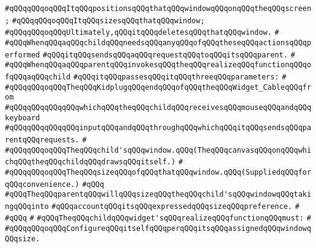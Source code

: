 \verb|#qQQqqQQqoqQQqItqQQqpositionsqQQqthatqQQqwindowqQQqonqQQqtheqQQqscreen;|\newline
\verb|#qQQqqQQqoqQQqItqQQqsizesqQQqthatqQQqwindow;|\newline
\verb|#qQQqqQQqoqQQqUltimately,qQQqitqQQqdeletesqQQqthatqQQqwindow.|\newline
\verb|#|\newline
\verb|#qQQqWhenqQQqaqQQqchildqQQqneedsqQQqanyqQQqofqQQqtheseqQQqactionsqQQqperformed|\newline
\verb|#qQQqitqQQqsendsqQQqaqQQqrequestqQQqtoqQQqitsqQQqparent.|\newline
\verb|#|\newline
\verb|#qQQqWhenqQQqaqQQqparentqQQqinvokesqQQqtheqQQqrealizeqQQqfunctionqQQqofqQQqaqQQqchild|\newline
\verb|#qQQqitqQQqpassesqQQqitqQQqthreeqQQqparameters:|\newline
\verb|#|\newline
\verb|#qQQqqQQqoqQQqTheqQQqKidplugqQQqendqQQqofqQQqtheqQQqWidget_CableqQQqfrom|\newline
\verb|#qQQqqQQqqQQqqQQqwhichqQQqtheqQQqchildqQQqreceivesqQQqmouseqQQqandqQQqkeyboard|\newline
\verb|#qQQqqQQqqQQqqQQqinputqQQqandqQQqthroughqQQqwhichqQQqitqQQqsendsqQQqparentqQQqrequests.|\newline
\verb|#|\newline
\verb|#qQQqqQQqoqQQqTheqQQqchild'sqQQqwindow.qQQq(TheqQQqcanvasqQQqonqQQqwhichqQQqtheqQQqchildqQQqdrawsqQQqitself.)|\newline
\verb|#|\newline
\verb|#qQQqqQQqoqQQqTheqQQqsizeqQQqofqQQqthatqQQqwindow.qQQq(SuppliedqQQqforqQQqconvenience.)|\newline
\verb|#qQQq|\newline
\verb|#qQQqTheqQQqparentqQQqwillqQQqsizeqQQqtheqQQqchild'sqQQqwindowqQQqtakingqQQqinto|\newline
\verb|#qQQqaccountqQQqitsqQQqexpressedqQQqsizeqQQqpreference.|\newline
\verb|#|\newline
\verb|#qQQq|\newline
\verb|#|\newline
\verb|#qQQqTheqQQqchildqQQqwidget'sqQQqrealizeqQQqfunctionqQQqmust:|\newline
\verb|#|\newline
\verb|#qQQqqQQqoqQQqConfigureqQQqitselfqQQqperqQQqitsqQQqassignedqQQqwindowqQQqsize.|\newline

